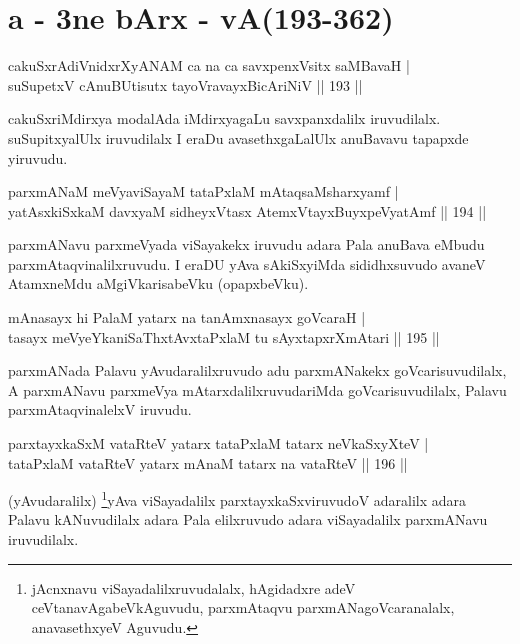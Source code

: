 \section*{a - 3ne bArx - vA(193-362)}

\begin{shl}
cakuSxrAdiVnidxrXyANAM ca na ca savxpenxV\s sitx saMBavaH | \\
suSupetxV cAnuBUtisutx tayoVravayxBicAriNiV \hfill ||  193 ||  
\end{shl}

\begin{artha}
cakuSxriMdirxya modalAda iMdirxyagaLu savxpanxdalilx iruvudilalx. suSupitxyalUlx iruvudilalx I eraDu avasethxgaLalUlx anuBavavu tapapxde yiruvudu.
\end{artha}

\begin{shl}
parxmANaM meVyaviSayaM tataPxlaM mAtaqsaMsharxyamf | \\
yatAsxkiSxkaM davxyaM sidheyxVtasx AtemxVtayxBuyxpeVyatAmf \hfill ||  194 ||  
\end{shl}

\begin{artha}
parxmANavu parxmeVyada viSayakekx iruvudu adara Pala anuBava eMbudu parxmAtaqvinalilxruvudu. I eraDU yAva sAkiSxyiMda sididhxsuvudo avaneV AtamxneMdu aMgiVkarisabeVku (opapxbeVku).
\end{artha}

\begin{shl}
mAnasayx hi PalaM yatarx na tanAmxnasayx goVcaraH | \\
tasayx meVyeYkaniSaThxtAvxtaPxlaM tu sAyxtapxrXmAtari \hfill ||  195 ||  
\end{shl}

\begin{artha}
parxmANada Palavu yAvudaralilxruvudo adu parxmANakekx goVcarisuvudilalx, A parxmANavu parxmeVya mAtarxdalilxruvudariMda goVcarisuvudilalx, Palavu parxmAtaqvinalelxV iruvudu.
\end{artha}

\begin{shl}
parxtayxkaSxM vataRteV yatarx tataPxlaM tatarx neVkaSxyXteV | \\
tataPxlaM vataRteV yatarx mAnaM tatarx na vataRteV \hfill ||  196 ||  
\end{shl}

\begin{artha}
(yAvudaralilx) \footnote{jAcnxnavu viSayadalilxruvudalalx, hAgidadxre adeV ceVtanavAgabeVkAguvudu, parxmAtaqvu parxmANagoVcaranalalx, anavasethxyeV Aguvudu.}yAva viSayadalilx parxtayxkaSxviruvudoV adaralilx adara Palavu kANuvudilalx adara Pala elilxruvudo adara viSayadalilx parxmANavu iruvudilalx.
\end{artha}

